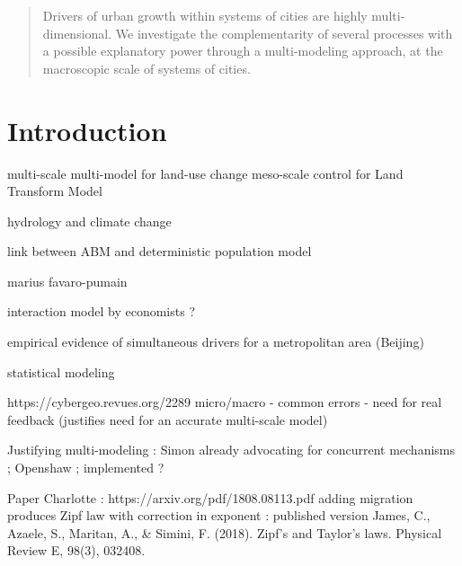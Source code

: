 \documentclass[alpha-refs]{wiley-article}
\begin{document}
\begin{abstract}
Drivers of urban growth within systems of cities are highly multi-dimensional. We investigate the complementarity of several processes with a possible explanatory power through a multi-modeling approach, at the macroscopic scale of systems of cities.

\end{abstract}




\section{Introduction}




\cite{verburg2008multi} multi-scale multi-model for land-use change
\cite{tayyebi2013hierarchical} meso-scale control for Land Transform Model %

\cite{wiley2010multi} hydrology and climate change


\cite{2018arXiv180404913C} link between ABM and deterministic population model

\cite{cottineau2015modular} marius 
\cite{favaro2011gibrat} favaro-pumain

\cite{hsieh2015housing} interaction model by economists ?


\cite{li2013forty} empirical evidence of simultaneous drivers for a metropolitan area (Beijing)

\cite{nong2011urban} statistical modeling



https://cybergeo.revues.org/2289 micro/macro - common errors - need for real feedback (justifies need for an accurate multi-scale model)



Justifying multi-modeling : Simon already advocating for concurrent mechanisms \cite{simon1968judging} ; Openshaw \cite{openshaw1983data} ; \cite{turton1997genetic} implemented ?

Paper Charlotte : https://arxiv.org/pdf/1808.08113.pdf adding migration produces Zipf law with correction in exponent : published version James, C., Azaele, S., Maritan, A., & Simini, F. (2018). Zipf's and Taylor's laws. Physical Review E, 98(3), 032408.


\end{document}
